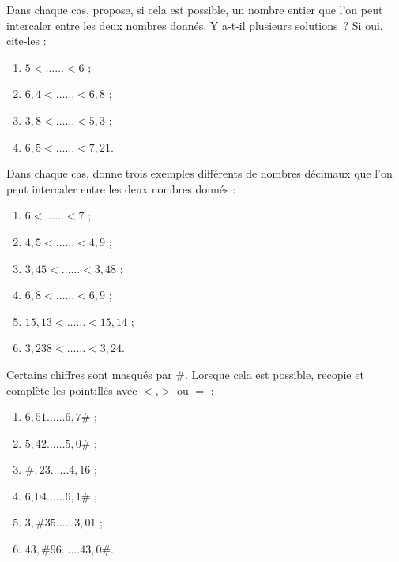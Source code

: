 \begin{exercice}
Dans chaque cas, propose, si cela est possible, un nombre entier que l'on peut intercaler entre les deux nombres donnés. 
Y a‑t‑il plusieurs solutions ? Si oui, cite‑les :
\begin{enumerate}
 \item $5 < …… < 6$ ;
 \item $6,4 < …… < 6,8$ ;
 \item $3,8 < …… < 5,3$ ;
 \item $6,5 < …… < 7,21$.
 \end{enumerate}
\end{exercice}


\begin{exercice}
Dans chaque cas, donne trois exemples différents de nombres décimaux que l'on peut intercaler entre les deux nombres donnés :
\begin{enumerate}
 \item $6 < …… < 7$ ;
 \item $4,5 < …… < 4,9$ ;
 \item $3,45 < …… < 3,48$ ;
 \item $6,8 < …… < 6,9$ ;
 \item $15,13 < …… < 15,14$ ;
 \item $3,238 < …… < 3,24$.
 \end{enumerate}
\end{exercice}


\begin{exercice}
Certains chiffres sont masqués par \#. Lorsque cela est possible, recopie et complète les pointillés avec $<$,$>$ ou $=$ :
\begin{enumerate} 
 \item $6,51 …… 6,7\#$ ;
 \item $5,42 …… 5,0\#$ ;
 \item $\#,23 …… 4,16$ ;
 \item $6,04 …… 6,1\#$ ;
 \item $3,\#35 …… 3,01$ ;
 \item $43,\#96 …… 43,0\#$.
 \end{enumerate}
\end{exercice}


